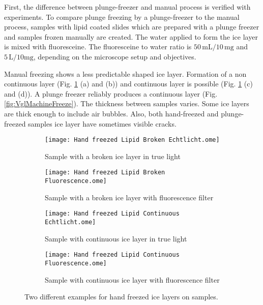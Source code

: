 First, the difference between plunge-freezer and manual process is verified with experiments. To compare plunge freezing by a plunge-freezer to the manual process, samples with lipid coated slides which are prepared with a plunge freezer and samples frozen manually are created. The water applied to form the ice layer is mixed with fluoresceine. The fluoresceine to water ratio is $50\,\si{\milli\liter}/10\,\si{\milli\gram}$ and $5\,\si{\liter}/10\si{\milli\gram}$, depending on the microscope setup and objectives.

Manual freezing shows a less predictable shaped ice layer. Formation of a non continuous layer (Fig. \ref{fig:VglHandFreeze} (a) and (b))  and continuous layer is possible (Fig. \ref{fig:VglHandFreeze} (c) and (d)). A plunge freezer reliably produces a continuous layer (Fig. \ref{fig:VglMachineFreeze}). The thickness between samples varies. Some ice layers are thick enough to include air bubbles. Also, both hand-freezed and plunge-freezed samples ice layer have sometimes visible cracks.

\begin{figure}[hbt!]
	\centering
	\begin{subfigure}[]{0.45\textwidth}
		\centering
		\texttt{[image: Hand freezed Lipid Broken Echtlicht.ome]}
		\caption{Sample with a broken ice layer in true light \newline}
	\end{subfigure}
	\begin{subfigure}[]{0.45\textwidth}
		\centering
		\texttt{[image: Hand freezed Lipid Broken Fluorescence.ome]}
		\caption{Sample with a broken ice layer with fluorescence filter}
	\end{subfigure}
	\begin{subfigure}[]{0.45\textwidth}
		\centering
		\texttt{[image: Hand freezed Lipid Continuous Echtlicht.ome]}
		\caption{Sample with continuous ice layer in true light \newline}
	\end{subfigure}
	\begin{subfigure}[]{0.45\textwidth}
		\centering
		\texttt{[image: Hand freezed Lipid Continuous Fluorescence.ome]}
		\caption{Sample with continuous ice layer with fluorescence filter}
	\end{subfigure}
	\caption{Two different examples for hand freezed ice layers on samples. }
	\label{fig:VglHandFreeze}
\end{figure}

